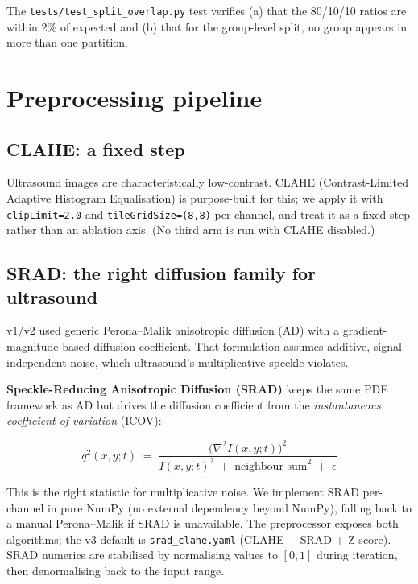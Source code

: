 \documentclass[10pt,a4paper]{article}
\begin{document}
The \texttt{tests/test\_split\_overlap.py} test verifies (a) that the
80/10/10 ratios are within 2\% of expected and (b) that for the
group-level split, no group appears in more than one partition.

\section{Preprocessing pipeline}

\subsection{CLAHE: a fixed step}

Ultrasound images are characteristically low-contrast. CLAHE
(Contrast-Limited Adaptive Histogram Equalisation) is purpose-built
for this; we apply it with \texttt{clipLimit=2.0} and
\texttt{tileGridSize=(8,8)} per channel, and treat it as a fixed step
rather than an ablation axis. (No third arm is run with CLAHE
disabled.)

\subsection{SRAD: the right diffusion family for ultrasound}

v1/v2 used generic Perona--Malik anisotropic diffusion (AD) with a
gradient-magnitude-based diffusion coefficient. That formulation
assumes additive, signal-independent noise, which ultrasound's
multiplicative speckle violates.

\textbf{Speckle-Reducing Anisotropic Diffusion (SRAD)}
\cite{yu:acton:2002} keeps the same PDE framework as AD but drives
the diffusion coefficient from the \textit{instantaneous coefficient
of variation} (ICOV):

\begin{equation}
  q^2(x, y; t)
  \;=\;
  \frac{\bigl(\nabla^2 I(x,y;t)\bigr)^2}
       {I(x,y;t)^2 \;+\; \text{neighbour sum}^2 \;+\; \epsilon}
\end{equation}

This is the right statistic for multiplicative noise. We implement
SRAD per-channel in pure NumPy (no external dependency beyond NumPy),
falling back to a manual Perona--Malik if SRAD is unavailable. The
preprocessor exposes both algorithms; the v3 default is
\texttt{srad\_clahe.yaml} (CLAHE + SRAD + Z-score). SRAD numerics are
stabilised by normalising values to $[0,1]$ during iteration, then
denormalising back to the input range.
\end{document}
